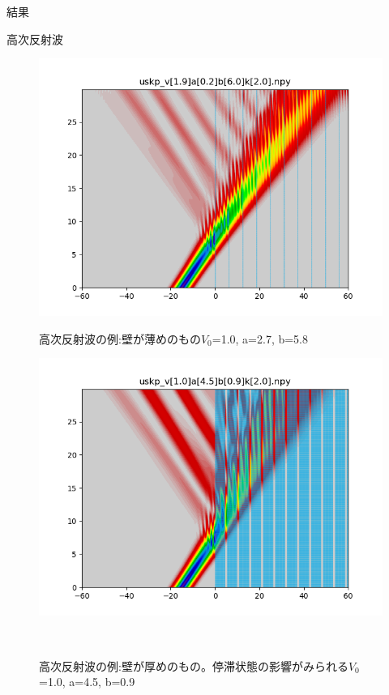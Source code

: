 \documentclass[a4paper, lualatex]{bxjsarticle}
\begin{document}
\begin{section}{結果}
    \begin{subsection}{高次反射波}
     \begin{figure}[h]
        \begin{minipage}{0.5\hsize}
            \centering
            \includegraphics[width=0.9\hsize]{tajuhan1.png}
            \caption{高次反射波の例:壁が薄めのもの$V_0$=1.0, a=2.7, b=5.8}
            \label{thin}
        \end{minipage}
        \begin{minipage}{0.5\hsize}
            \centering
            \includegraphics[width=0.9\hsize]{tajuhan2.png}
            \caption{高次反射波の例:壁が厚めのもの。停滞状態の影響がみられる$V_0$=1.0, a=4.5, b=0.9}
            \label{thick}
        \end{minipage}\\
        \begin{minipage}{0.5\hsize}

\end{minipage}
\end{figure}
\end{subsection}
\end{section}
\end{document}
